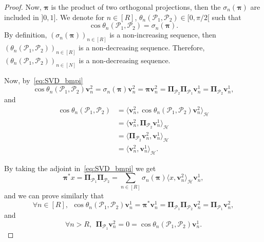 \documentclass[twoside,11pt]{book}
\numberwithin{theorem}{chapter}
\numberwithin{definition}{chapter}
\numberwithin{proposition}{chapter}
\numberwithin{corollary}{chapter}
\numberwithin{example}{chapter}
\numberwithin{lemma}{chapter}
\numberwithin{assumption}{chapter}
\numberwithin{equation}{chapter}
\numberwithin{figure}{chapter}
\begin{document}
\begin{proof}

Now, $\bm{\pi}$ is the product of two orthogonal projections, then the $\sigma_{n}(\bm{\pi})$ are included in $]0,1]$. We denote for $n \in [R]$, $\theta_{n}(\mathcal{P}_1,\mathcal{P}_2) \in [0,\pi/2[$ such that
\begin{equation}
\cos \theta_n(\mathcal{P}_1,\mathcal{P}_2) = \sigma_{n}(\bm{\pi}).
\end{equation}
By definition, $(\sigma_{n}(\bm{\pi}))_{n \in [R]}$ is a non-increasing sequence, then $(\theta_{n}(\mathcal{P}_1,\mathcal{P}_2))_{n \in [R]}$ is a non-decreasing sequence. Therefore, $(\theta_{n}(\mathcal{P}_1,\mathcal{P}_2))_{n \in [N]}$
is a non-decreasing sequence.

Now, by~\eqref{eq:SVD_bmpi}
\begin{equation}
\cos \theta_n(\mathcal{P}_1,\mathcal{P}_2) \bm{v}^{2}_{n} = \sigma_{n}(\bm{\pi}) \bm{v}^{2}_{n} = \bm{\pi} \bm{v}^{2}_{n} = \bm{\Pi}_{\mathcal{P}_{2}} \bm{\Pi}_{\mathcal{P}_{1}} \bm{v}^{1}_{n} = \bm{\Pi}_{\mathcal{P}_{2}} \bm{v}^{1}_{n},
\end{equation}
and
\begin{align}
\cos \theta_n(\mathcal{P}_1,\mathcal{P}_2) & =  \langle \bm{v}^{2}_{n},  \cos \theta_n(\mathcal{P}_1,\mathcal{P}_2) \bm{v}^{2}_{n} \rangle_{\mathcal{H}} \nonumber \\
& = \langle \bm{v}^{2}_{n}, \bm{\Pi}_{\mathcal{P}_2} \bm{v}^{1}_{n} \rangle_{\mathcal{H}} \nonumber \\
& = \langle \bm{\Pi}_{\mathcal{P}_2} \bm{v}^{2}_{n},  \bm{v}^{1}_{n} \rangle_{\mathcal{H}} \nonumber \\
& = \langle \bm{v}^{2}_{n},  \bm{v}^{1}_{n} \rangle_{\mathcal{H}}.
\end{align}

By taking the adjoint in~\eqref{eq:SVD_bmpi} we get
\begin{equation}
 \bm{\pi}^{*} x = \bm{\Pi}_{\mathcal{P}_1}\bm{\Pi}_{\mathcal{P}_2} = \sum\limits_{n \in [R]} \sigma_{n}(\bm{\pi}) \langle x,\bm{v}^{2}_{n} \rangle_{\mathcal{H}} \bm{v}^{1}_{n},
\end{equation}
and we can prove similarly that
\begin{equation}
\forall n \in [R], \:\:\cos \theta_n(\mathcal{P}_1,\mathcal{P}_2) \bm{v}^{1}_{n} = \bm{\pi}^{*} \bm{v}^{1}_{n} = \bm{\Pi}_{\mathcal{P}_{1}} \bm{\Pi}_{\mathcal{P}_{2}} \bm{v}^{2}_{n} = \bm{\Pi}_{\mathcal{P}_{1}} \bm{v}^{2}_{n},
\end{equation}
and
\begin{equation}
\forall n >R, \:\:\bm{\Pi}_{\mathcal{P}_{1}} \bm{v}^{2}_{n} = 0 = \cos \theta_{n}(\mathcal{P}_1,\mathcal{P}_2) \bm{v}^{1}_{n}.
\end{equation}

\end{proof}
\end{document}

